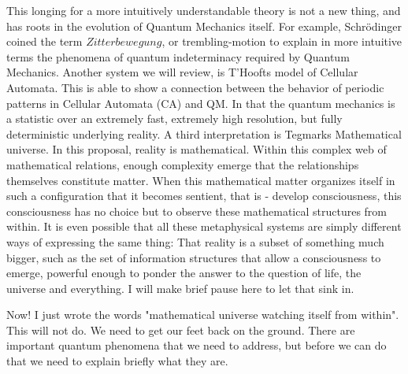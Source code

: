 \documentclass[notitlepage]{report}
\begin{document}
This longing for a more intuitively understandable theory is not a new thing, and has roots in the evolution of Quantum Mechanics itself. For example, Schrödinger coined the term $Zitterbewegung$, or trembling-motion to explain in more intuitive terms the phenomena of quantum indeterminacy required by Quantum Mechanics. Another system we will review, is  T'Hoofts model of Cellular Automata. This is able to show a connection between the behavior of periodic patterns in Cellular Automata (CA) and QM. In that the quantum mechanics is a statistic over an extremely fast, extremely high resolution, but fully deterministic underlying reality. A third interpretation is Tegmarks Mathematical universe. In this proposal, reality is mathematical. Within this complex web of mathematical relations, enough complexity emerge  that the relationships themselves constitute matter. When this mathematical matter organizes itself in such a configuration that it becomes sentient, that is - develop consciousness, this consciousness has no choice but to  observe these mathematical structures from within. It is even possible that all these metaphysical systems are simply different ways of expressing the same thing: That reality is a subset of something much bigger, such as the set of information structures that allow a consciousness to emerge, powerful enough to ponder the answer to the question of life, the universe and everything. I will make brief pause here to let that sink in. 

Now! I just wrote the words "mathematical universe watching itself from within". This will not do. We need to get our feet back on the ground. There are important quantum phenomena that we need to address, but before we can do that we need to explain briefly what they are.
\end{document}
